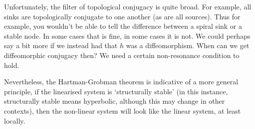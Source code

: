 Unfortunately, the filter of topological conjugacy is quite broad. For example, all sinks are topologically conjugate to one another (as are all sources). Thus for example, you wouldn't be able to tell the difference between a spiral sink or a stable node. In some cases that is fine, in some cases it is not. We could perhaps say a bit more if we instead had that $h$ was a diffeomorphism. When can we get diffeomorphic conjugacy then? We need a certain non-resonance condition to hold.

Nevertheless, the Hartman-Grobman theorem is indicative of a more general principle, if the linearised system is `structurally stable' (in this instance, structurally stable means hyperbolic, although this may change in other contexts), then the non-linear system will look like the linear system, at least locally.  


